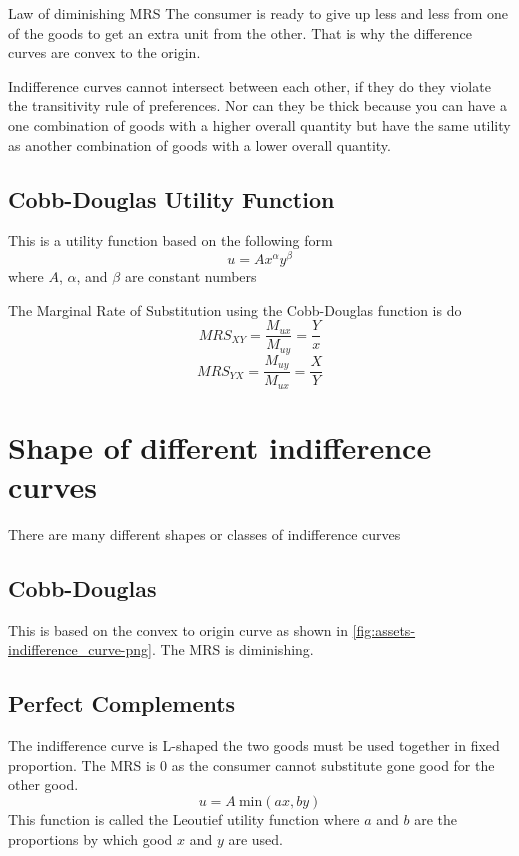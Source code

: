 \documentclass[../ECON-281-Notes.tex]{subfiles}
\begin{document}
\begin{DndSidebar}[color=PhbLightGreen]{Law of diminishing MRS}
  The consumer is ready to give up less and less from one of the goods to get an extra unit from the other.
  That is why the difference curves are convex to the origin. 
\end{DndSidebar}

\begin{Note}
  Indifference curves cannot intersect between each other, if they do they violate the transitivity rule of preferences.
  Nor can they be thick because you can have a one combination of goods with a higher overall quantity but have the same utility as another combination of goods with a lower overall quantity. 
\end{Note}

\subsection{Cobb-Douglas Utility Function}
This is a utility function based on the following form
\begin{equation}
  u = Ax^{\alpha} y^{\beta}
\end{equation}
where $A$, $\alpha$, and $\beta$ are constant numbers

The Marginal Rate of Substitution using the Cobb-Douglas function is do
\begin{equation}
  MRS_{XY} = \frac{M_{ux}}{M_{uy}} = \frac{Y}{x}
\end{equation}
\begin{equation}
  MRS_{YX} = \frac{M_{uy}}{M_{ux}} = \frac{X}{Y}
\end{equation}


\section{Shape of different indifference curves}
There are many different shapes or classes of indifference curves
\subsection{Cobb-Douglas}
This is based on the convex to origin curve as shown in \cref{fig:assets-indifference_curve-png}. The MRS is diminishing.

\subsection{Perfect Complements}
The indifference curve is L-shaped the two goods must be used together in fixed proportion. 
The MRS is 0 as the consumer cannot substitute gone good for the other good.
\begin{equation}
  u = A\ \text{min}(ax, by)
\end{equation}
This function is called the Leoutief utility function where $a$ and $b$ are the proportions by which good $x$ and $y$ are used.
\end{document}
